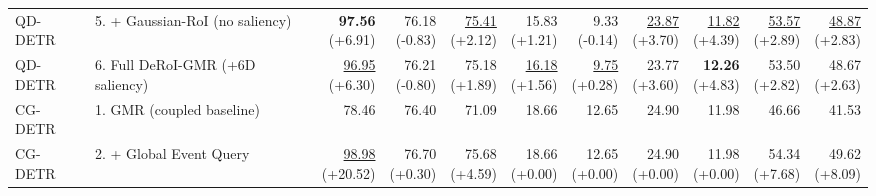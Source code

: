 \documentclass{article}
\begin{document}
{\begin{tabular}{llrrrrrrrrr}
QD-DETR & 5. + Gaussian-RoI (no saliency) & \shortstack{\textbf{97.56} \\ {\scriptsize (+6.91)}} & \shortstack{76.18 \\ {\scriptsize (-0.83)}} & \shortstack{\underline{75.41} \\ {\scriptsize (+2.12)}} & \shortstack{15.83 \\ {\scriptsize (+1.21)}} & \shortstack{9.33 \\ {\scriptsize (-0.14)}} & \shortstack{\underline{23.87} \\ {\scriptsize (+3.70)}} & \shortstack{\underline{11.82} \\ {\scriptsize (+4.39)}} & \shortstack{\underline{53.57} \\ {\scriptsize (+2.89)}} & \shortstack{\underline{48.87} \\ {\scriptsize (+2.83)}} \\
QD-DETR & 6. Full DeRoI-GMR (+6D saliency) & \shortstack{\underline{96.95} \\ {\scriptsize (+6.30)}} & \shortstack{76.21 \\ {\scriptsize (-0.80)}} & \shortstack{75.18 \\ {\scriptsize (+1.89)}} & \shortstack{\underline{16.18} \\ {\scriptsize (+1.56)}} & \shortstack{\underline{9.75} \\ {\scriptsize (+0.28)}} & \shortstack{23.77 \\ {\scriptsize (+3.60)}} & \shortstack{\textbf{12.26} \\ {\scriptsize (+4.83)}} & \shortstack{53.50 \\ {\scriptsize (+2.82)}} & \shortstack{48.67 \\ {\scriptsize (+2.63)}} \\
\midrule
CG-DETR & 1. GMR (coupled baseline) & 78.46 & 76.40 & 71.09 & 18.66 & 12.65 & 24.90 & 11.98 & 46.66 & 41.53 \\
CG-DETR & 2. + Global Event Query & \shortstack{\underline{98.98} \\ {\scriptsize (+20.52)}} & \shortstack{76.70 \\ {\scriptsize (+0.30)}} & \shortstack{75.68 \\ {\scriptsize (+4.59)}} & \shortstack{18.66 \\ {\scriptsize (+0.00)}} & \shortstack{12.65 \\ {\scriptsize (+0.00)}} & \shortstack{24.90 \\ {\scriptsize (+0.00)}} & \shortstack{11.98 \\ {\scriptsize (+0.00)}} & \shortstack{54.34 \\ {\scriptsize (+7.68)}} & \shortstack{49.62 \\ {\scriptsize (+8.09)}} \\

\end{tabular}}
\end{document}
